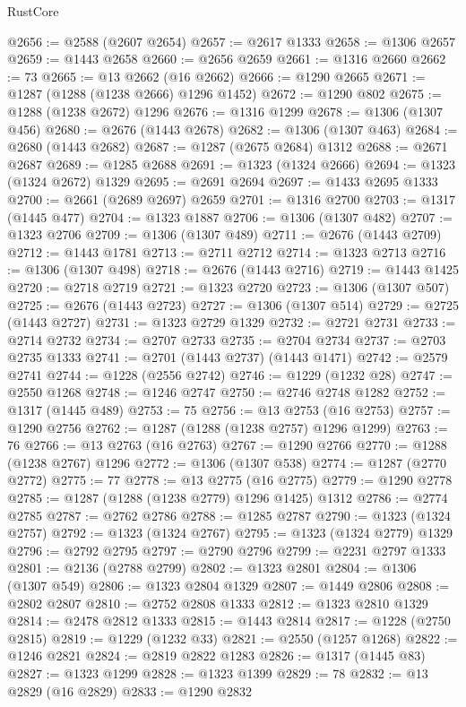 \begin{lexlean}{RustCore}
\begin{coremodule}
@2656 := @2588 (@2607 @2654)
@2657 := @2617 @1333
@2658 := @1306 @2657
@2659 := @1443 @2658
@2660 := @2656 @2659
@2661 := @1316 @2660
@2662 := 73
@2665 := @13 @2662 (@16 @2662)
@2666 := @1290 @2665
@2671 := @1287 (@1288 (@1238 @2666) @1296 @1452)
@2672 := @1290 @802
@2675 := @1288 (@1238 @2672) @1296
@2676 := @1316 @1299
@2678 := @1306 (@1307 @456)
@2680 := @2676 (@1443 @2678)
@2682 := @1306 (@1307 @463)
@2684 := @2680 (@1443 @2682)
@2687 := @1287 (@2675 @2684) @1312
@2688 := @2671 @2687
@2689 := @1285 @2688
@2691 := @1323 (@1324 @2666)
@2694 := @1323 (@1324 @2672) @1329
@2695 := @2691 @2694
@2697 := @1433 @2695 @1333
@2700 := @2661 (@2689 @2697) @2659
@2701 := @1316 @2700
@2703 := @1317 (@1445 @477)
@2704 := @1323 @1887
@2706 := @1306 (@1307 @482)
@2707 := @1323 @2706
@2709 := @1306 (@1307 @489)
@2711 := @2676 (@1443 @2709)
@2712 := @1443 @1781
@2713 := @2711 @2712
@2714 := @1323 @2713
@2716 := @1306 (@1307 @498)
@2718 := @2676 (@1443 @2716)
@2719 := @1443 @1425
@2720 := @2718 @2719
@2721 := @1323 @2720
@2723 := @1306 (@1307 @507)
@2725 := @2676 (@1443 @2723)
@2727 := @1306 (@1307 @514)
@2729 := @2725 (@1443 @2727)
@2731 := @1323 @2729 @1329
@2732 := @2721 @2731
@2733 := @2714 @2732
@2734 := @2707 @2733
@2735 := @2704 @2734
@2737 := @2703 @2735 @1333
@2741 := @2701 (@1443 @2737) (@1443 @1471)
@2742 := @2579 @2741
@2744 := @1228 (@2556 @2742)
@2746 := @1229 (@1232 @28)
@2747 := @2550 @1268
@2748 := @1246 @2747
@2750 := @2746 @2748 @1282
@2752 := @1317 (@1445 @489)
@2753 := 75
@2756 := @13 @2753 (@16 @2753)
@2757 := @1290 @2756
@2762 := @1287 (@1288 (@1238 @2757) @1296 @1299)
@2763 := 76
@2766 := @13 @2763 (@16 @2763)
@2767 := @1290 @2766
@2770 := @1288 (@1238 @2767) @1296
@2772 := @1306 (@1307 @538)
@2774 := @1287 (@2770 @2772)
@2775 := 77
@2778 := @13 @2775 (@16 @2775)
@2779 := @1290 @2778
@2785 := @1287 (@1288 (@1238 @2779) @1296 @1425) @1312
@2786 := @2774 @2785
@2787 := @2762 @2786
@2788 := @1285 @2787
@2790 := @1323 (@1324 @2757)
@2792 := @1323 (@1324 @2767)
@2795 := @1323 (@1324 @2779) @1329
@2796 := @2792 @2795
@2797 := @2790 @2796
@2799 := @2231 @2797 @1333
@2801 := @2136 (@2788 @2799)
@2802 := @1323 @2801
@2804 := @1306 (@1307 @549)
@2806 := @1323 @2804 @1329
@2807 := @1449 @2806
@2808 := @2802 @2807
@2810 := @2752 @2808 @1333
@2812 := @1323 @2810 @1329
@2814 := @2478 @2812 @1333
@2815 := @1443 @2814
@2817 := @1228 (@2750 @2815)
@2819 := @1229 (@1232 @33)
@2821 := @2550 (@1257 @1268)
@2822 := @1246 @2821
@2824 := @2819 @2822 @1283
@2826 := @1317 (@1445 @83)
@2827 := @1323 @1299
@2828 := @1323 @1399
@2829 := 78
@2832 := @13 @2829 (@16 @2829)
@2833 := @1290 @2832

\end{coremodule}
\end{lexlean}

